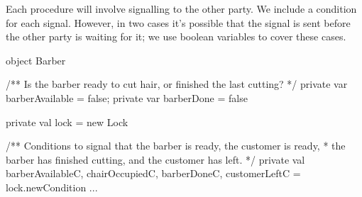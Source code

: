 
\begin{slide}

Each procedure will involve signalling to the other party.  We include a
condition for each signal.  However, in two cases it's possible that the
signal is sent before the other party is waiting for it; we use boolean
variables to cover these cases.

\begin{scala}
object Barber{
  /** Is the barber ready to cut hair, or finished the last cutting? */
  private var barberAvailable = false; private var barberDone = false

  private val lock = new Lock
  
  /** Conditions to signal that the barber is ready, the customer is ready,
    * the barber has finished cutting, and the customer has left. */
  private val barberAvailableC, chairOccupiedC, barberDoneC, customerLeftC =
    lock.newCondition
  ...
}
\end{scala}
\end{slide}


\begin{slide}

\def\cx{4.0} \def\ba{8.5} \def\bd{11.5}
\end{slide}

